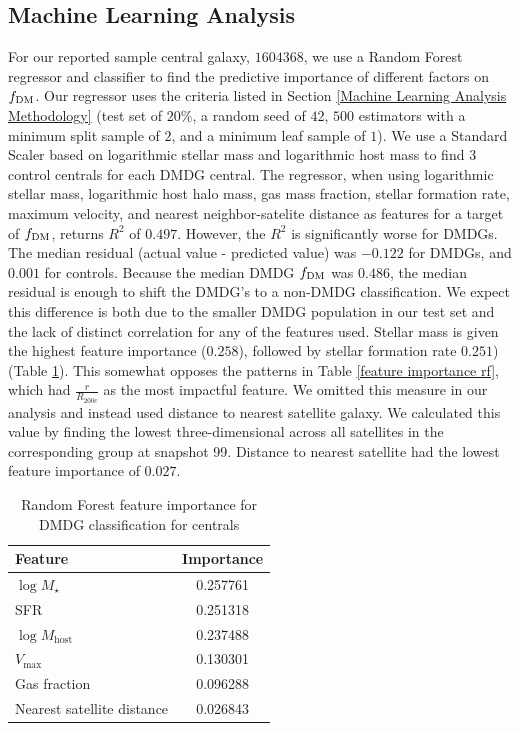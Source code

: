 \documentclass[twocolumn]{openjournal}
\begin{document}
\subsection{Machine Learning Analysis} 
For our reported sample central galaxy, $1604368$, we use a Random Forest regressor and classifier to find the predictive importance of different factors on $f_\textup{DM}$. Our regressor uses the criteria listed in Section \ref{Machine Learning Analysis Methodology} (test set of $20\%$, a random seed of $42$, $500$ estimators with a minimum split sample of $2$, and a minimum leaf sample of $1$). We use a Standard Scaler \cite{sciKitLearn} based on logarithmic stellar mass and logarithmic host mass to find $3$ control centrals for each DMDG central. The regressor, when using logarithmic stellar mass,  logarithmic host halo mass, gas mass fraction, stellar formation rate, maximum velocity, and nearest neighbor-satelite distance as features for a target of $f_\textup{DM}$, returns $R^2$ of $0.497$. However, the $R^2$ is significantly worse for DMDGs. The median residual (actual value - predicted value) was $-0.122$ for DMDGs, and $0.001$ for controls. Because the median DMDG $f_\textup{DM}$ was $0.486$, the median residual is enough to shift the DMDG's to a non-DMDG classification. We expect this difference is both due to the smaller DMDG population in our test set and the lack of distinct correlation for any of the features used. Stellar mass is given the highest feature importance ($0.258$), followed by stellar formation rate $0.251$) (Table \ref{feature importance rf centrals}). This somewhat opposes the patterns in Table \ref{feature importance rf}, which had $\frac{r}{R_{200c}}$ as the most impactful feature. We omitted this measure in our analysis and instead used distance to nearest satellite galaxy. We calculated this value by finding the lowest three-dimensional across all satellites in the corresponding group at snapshot 99. Distance to nearest satellite had the lowest feature importance of $0.027$.

\begin{table}[ht]
\centering
\caption{Random Forest feature importance for DMDG classification for centrals}
\label{feature importance rf centrals}
\begin{tabular}{lc}
\hline
\textbf{Feature} & \textbf{Importance} \\
\hline
$\log M_{\star}$ & 0.257761 \\
SFR & 0.251318 \\
$\log M_{\mathrm{host}}$ & 0.237488 \\
$V_{\max}$ & 0.130301 \\
Gas fraction & 0.096288 \\
Nearest satellite distance & 0.026843 \\
\hline
\end{tabular}
\end{table}
\end{document}
